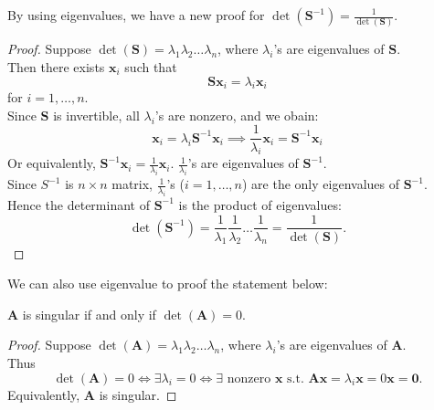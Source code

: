By using eigenvalues, we have a new proof for $\det(\bm S^{-1})=\frac{1}{\det(\bm S)}$.
\begin{proof}
Suppose $\det(\bm S)=\lambda_1\lambda_2\dots\lambda_n$, where $\lambda_i$'s are eigenvalues of $\bm S$.\\
Then there exists $\bm x_i$ such that
\[
\bm S\bm x_i=\lambda_i\bm x_i
\]
for $i=1,\dots,n$.\\
Since $\bm S$ is invertible, all $\lambda_i$'s are nonzero, and we obain:
\[
\bm x_i=\lambda_i\bm S^{-1}\bm x_i
\implies
\frac{1}{\lambda_i}\bm x_i=\bm S^{-1}\bm x_i
\]
Or equivalently, $\bm S^{-1}\bm x_i=\frac{1}{\lambda_i}\bm x_i$. $\frac{1}{\lambda_i}$'s are eigenvalues of $\bm S^{-1}$.\\ Since $S^{-1}$ is $n\times n$ matrix, $\frac{1}{\lambda_i}$'s ($i=1,\dots,n$) are the only eigenvalues of $\bm S^{-1}$.
\\ Hence the determinant of $\bm S^{-1}$ is the product of eigenvalues:
\[
\det(\bm S^{-1})=\frac{1}{\lambda_1}\frac{1}{\lambda_2}\dots\frac{1}{\lambda_n}=\frac{1}{\det(\bm S)}.
\]
\end{proof}
We can also use eigenvalue to proof the statement below:
\begin{proposition}
$\bm A$ is singular if and only if $\det(\bm A)=0.$
\end{proposition}
\begin{proof}
Suppose $\det(\bm A)=\lambda_1\lambda_2\dots\lambda_n$, where $\lambda_i$'s are eigenvalues of $\bm A$.\\
Thus
\[
\det(\bm A)=0\Longleftrightarrow
\exists\lambda_i=0\Longleftrightarrow
\exists\text{ nonzero }\bm x\text{ s.t. }\bm A\bm x=\lambda_i\bm x=0\bm x=\bm 0.
\]
Equivalently, $\bm A$ is singular.
\end{proof}
\newpage
